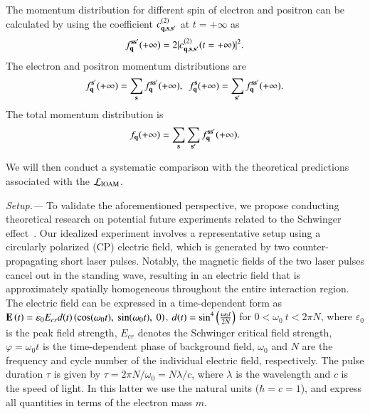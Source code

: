 \documentclass[prl,twocolumn,floatfix,amsmath,nofootinbib,superscriptaddress,amssymb,preprintnumbers,floatfix]{revtex4-1}
\begin{document}
The momentum distribution for different spin of electron and positron can be calculated by using the coefficient $c_{\bf{q},\bf{s},\bf{s}'}^{(2)}$ at $t=+\infty$ as
\begin{eqnarray}\label{eq:9}
f_{\bf{q}}^{\bf{s}\bf{s}'}(+\infty)=2|c_{\bf{q},\bf{s},\bf{s}'}^{(2)}(t=+\infty)|^2.
\end{eqnarray}
The electron and positron  momentum distributions are
\begin{equation}\label{eq:10}
f_{\bf{q}}^{\bf{s}'}(+\infty)=\sum_{\bf s} f_{\bf{q}}^{\bf{s}\bf{s}'}(+\infty),\ \ f_{\bf{q}}^{\bf{s}}(+\infty)=\sum_{\bf s'} f_{\bf{q}}^{\bf{s}\bf{s}'}(+\infty).
\end{equation}
The total momentum distribution is
\begin{eqnarray}\label{eq:11}
f_{\bf{q}}(+\infty)=\sum_{\bf s} \sum_{\bf s'} f_{\bf{q}}^{\bf{s}\bf{s}'}(+\infty).
\end{eqnarray}

We will then conduct a systematic comparison with the theoretical predictions associated with the $\mathcal{L}_{\rm IOAM}$.

\emph{Setup.---}
To validate the aforementioned perspective, we propose conducting theoretical research on potential future experiments related to the Schwinger effect~\cite{Ringwald:2001ib,Alkofer:2001ik,Heinzl:2009bmy,Fedotov:2022ely}. Our idealized experiment involves a representative setup using a circularly polarized (CP) electric field, which is generated by two counter-propagating short laser pulses. Notably, the magnetic fields of the two laser pulses cancel out in the standing wave, resulting in an electric field that is approximately spatially homogeneous throughout the entire interaction region. The electric field can be expressed in a time-dependent form as ${\bf E}\left(t\right)=\varepsilon_{0} E_{cr} d(t) \left({\rm cos}(\omega_{0} t),~{\rm sin}(\omega_{0} t ),~0 \right)$, $d(t) ={\rm sin}^{4}\left(\frac{\omega_{0} t}{2N}\right)$ for $0<\omega_{0}~t<2\pi N$, where $\varepsilon_{0}$ is the peak field strength, $E_{cr}$ denotes the Schwinger critical field strength, $\varphi=\omega_{0} t$ is the time-dependent phase of background field, $\omega_{0}$ and $N$ are the frequency and cycle number of the individual electric field, respectively. The pulse duration $\tau$ is given by $\tau=2\pi N/\omega_0=N \lambda/c$, where $\lambda$ is the wavelength and $c$ is the speed of light. In this latter we use the natural units ($\hbar=c=1$), and express all quantities in terms of the electron mass $m$.
\end{document}
